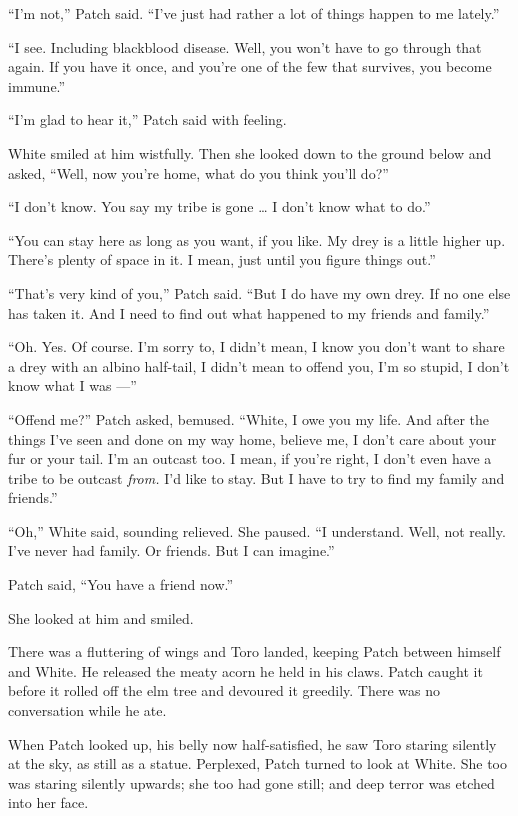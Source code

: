 \documentclass[ebook,oneside,openany,17pt]{memoir}
\begin{document}
“I’m not,” Patch said. “I’ve just had rather a lot of things happen to
me lately.”

“I see. Including blackblood disease. Well, you won’t have to go
through that again. If you have it once, and you’re one of the few
that survives, you become immune.”

“I’m glad to hear it,” Patch said with feeling.

White smiled at him wistfully. Then she looked down to the ground
below and asked, “Well, now you’re home, what do you think you’ll do?”

“I don’t know. You say my tribe is gone … I don’t know what to do.”

“You can stay here as long as you want, if you like. My drey is a
little higher up. There’s plenty of space in it. I mean, just until
you figure things out.”

“That’s very kind of you,” Patch said. “But I do have my own drey. If
no one else has taken it. And I need to find out what happened to my
friends and family.”

“Oh. Yes. Of course. I’m sorry to, I didn’t mean, I know you don’t
want to share a drey with an albino half-tail, I didn’t mean to offend
you, I’m so stupid, I don’t know what I was —”

“Offend me?” Patch asked, bemused. “White, I owe you my life. And
after the things I’ve seen and done on my way home, believe me, I
don’t care about your fur or your tail. I’m an outcast too. I mean, if
you’re right, I don’t even have a tribe to be outcast \emph{from.}
I’d like to stay. But I have to try to find my family and friends.”

“Oh,” White said, sounding relieved. She paused. “I understand. Well,
not really. I’ve never had family. Or friends. But I can imagine.”

Patch said, “You have a friend now.”

She looked at him and smiled.

There was a fluttering of wings and Toro landed, keeping Patch between
himself and White. He released the meaty acorn he held in his
claws. Patch caught it before it rolled off the elm tree and devoured
it greedily. There was no conversation while he ate.

When Patch looked up, his belly now half-satisfied, he saw Toro
staring silently at the sky, as still as a statue. Perplexed, Patch
turned to look at White. She too was staring silently upwards; she too
had gone still; and deep terror was etched into her face.
\end{document}
